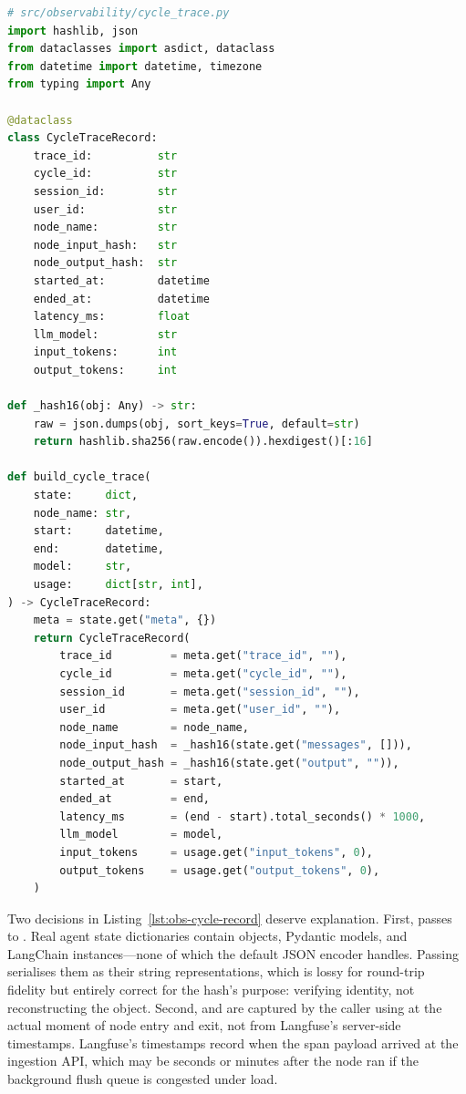 \begin{lstlisting}[language=Python,
  caption={\code{CycleTraceRecord} dataclass and span attachment helper},
  label={lst:obs-cycle-record}]
# src/observability/cycle_trace.py
import hashlib, json
from dataclasses import asdict, dataclass
from datetime import datetime, timezone
from typing import Any

@dataclass
class CycleTraceRecord:
    trace_id:          str
    cycle_id:          str
    session_id:        str
    user_id:           str
    node_name:         str
    node_input_hash:   str
    node_output_hash:  str
    started_at:        datetime
    ended_at:          datetime
    latency_ms:        float
    llm_model:         str
    input_tokens:      int
    output_tokens:     int

def _hash16(obj: Any) -> str:
    raw = json.dumps(obj, sort_keys=True, default=str)
    return hashlib.sha256(raw.encode()).hexdigest()[:16]

def build_cycle_trace(
    state:     dict,
    node_name: str,
    start:     datetime,
    end:       datetime,
    model:     str,
    usage:     dict[str, int],
) -> CycleTraceRecord:
    meta = state.get("meta", {})
    return CycleTraceRecord(
        trace_id         = meta.get("trace_id", ""),
        cycle_id         = meta.get("cycle_id", ""),
        session_id       = meta.get("session_id", ""),
        user_id          = meta.get("user_id", ""),
        node_name        = node_name,
        node_input_hash  = _hash16(state.get("messages", [])),
        node_output_hash = _hash16(state.get("output", "")),
        started_at       = start,
        ended_at         = end,
        latency_ms       = (end - start).total_seconds() * 1000,
        llm_model        = model,
        input_tokens     = usage.get("input_tokens", 0),
        output_tokens    = usage.get("output_tokens", 0),
    )
\end{lstlisting}

Two decisions in Listing~\ref{lst:obs-cycle-record} deserve explanation.
First,  passes  to .
Real agent state dictionaries contain  objects, Pydantic
models, and LangChain  instances---none of which the
default JSON encoder handles. Passing  serialises
them as their string representations, which is lossy for round-trip
fidelity but entirely correct for the hash's purpose: verifying
identity, not reconstructing the object. Second,  and
 are captured by the caller using
 at the actual moment of node entry
and exit, not from Langfuse's server-side timestamps. Langfuse's
timestamps record when the span payload arrived at the ingestion API,
which may be seconds or minutes after the node ran if the background
flush queue is congested under load.


